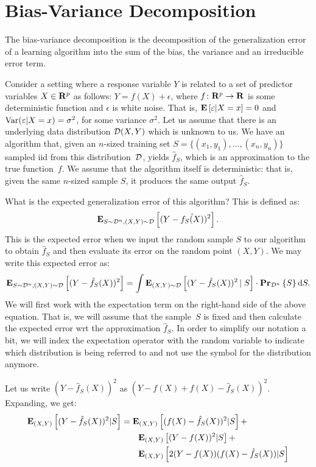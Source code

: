 \chapter{Bias-Variance Decomposition}

The bias-variance decomposition is the decomposition of the generalization
error of a learning algorithm into the sum of the bias, the variance and an irreducible
error term.

Consider a setting where a response variable $Y$ is related to a set of
predictor variables $X \in \mathbf{R}^p$ as follows: $Y = f(X) + \epsilon$, where
$f \colon \mathbf{R}^p \rightarrow \mathbf{R}$ is some deterministic function and
$\epsilon$ is white noise. That is, $\mathbf{E} \left [ \varepsilon \vert X = x \right ] = 0$ and
$\text{Var} (\varepsilon \vert X = x) = \sigma^2$, for some variance $\sigma^2$. Let us
assume that there is an underlying data distribution $\mathcal{D} (X, Y)$ which is
unknown to us. We have an algorithm that, given an $n$-sized training set
$S = \{ (x_1, y_1), \ldots, (x_n, y_n) \}$ sampled iid from this distribution~$\mathcal{D}$,
yields $\hat{f}_S$, which is an approximation to the true function~$f$.
We assume that the algorithm itself is deterministic: that is, given the same
$n$-sized sample $S$, it produces the same output $\hat{f}_S$.

What is the expected generalization error of this algorithm? This is defined
as:
\begin{equation}
    \mathbf{E}_{S \sim \mathcal{D}^n, (X, Y) \sim \mathcal{D}} \left [ (Y - \hat{f_S(X)})^2 \right ].
\end{equation}
This is the expected error when we input the random sample $S$ to our algorithm
to obtain $\hat{f}_S$ and then evaluate its error on the random point $(X, Y)$.
We may write this expected error as:
\begin{equation} \label{eqn:basic_integral}
    \mathbf{E}_{S \sim \mathcal{D}^n, (X, Y) \sim \mathcal{D}} \left [ (Y - \hat{f}_S(X))^2 \right ] =
    \int \mathbf{E}_{(X, Y) \sim \mathcal{D}} \left [ (Y - \hat{f}_S(X))^2 \left \vert \right . S \right ]
    \cdot \mathbf{Pr}_{\mathcal{D}^n} \left \{ S \right \} \text{d} S.
\end{equation}
We will first work with the expectation term on the right-hand side of the above
equation. That is, we will assume that the sample~$S$ is fixed and then calculate
the expected error wrt the approximation $\hat{f}_S$. In order to simplify our
notation a bit, we will index the expectation operator with the random variable
to indicate which distribution is being referred to and not use the symbol
for the distribution anymore.

Let us write $(Y - \hat{f}_S(X))^2$ as $(Y - f(X) + f(X) - \hat{f}_S(X))^2$.
Expanding, we get:
\begin{equation}\label{eqn:break_up}
\begin{split}
    \mathbf{E}_{(X, Y)} \left [ (Y - \hat{f}_S(X))^2 \vert S \right ] & =
    \mathbf{E}_{(X, Y)} \left [ (f(X) - \hat{f}_S(X))^2 \vert S \right ] + \\
    & \quad \quad \mathbf{E}_{(X, Y)} \left [ (Y - f(X))^2 \vert S \right ] + \\
    & \quad \quad \mathbf{E}_{(X, Y)} \left [ 2 (Y - f(X)) (f(X) - \hat{f}_S(X)) \vert S \right ]
\end{split}
\end{equation}

